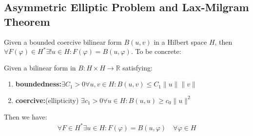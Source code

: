\subsection{Asymmetric Elliptic Problem and Lax-Milgram Theorem}
\begin{theorem}
	Given a bounded coercive bilinear form $B(u, v)$ in a Hilbert space $H$, then $\forall F(\varphi) \in H^* \exists!u \in H:F(\varphi) = B(u, \varphi)$. To be concrete:\par 
	Given a bilinear form in $B:H \times H \rightarrow \mathbb{R}$ satisfying:
	\begin{enumerate}
		\item \textbf{boundedness:}$\exists C_1>0\forall u, v\in H: B(u, v) \leq C_1 \|u\|\|v\|$
		\item \textbf{coercive:}(ellipticity) $\exists c_1 > 0 \forall u \in H: B(u, u) \geq c_0 \|u\|^2$
	\end{enumerate}
	Then we have:
	\begin{align*}
		\forall F \in H^* \exists u \in H: F(\varphi) = B(u, \varphi)\quad \forall \varphi \in H
	\end{align*}
\end{theorem}
